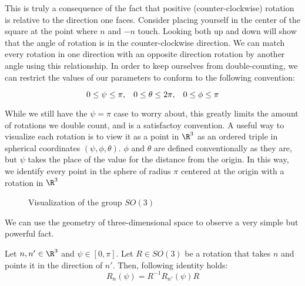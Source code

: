 This is truly a consequence of the fact that positive (counter-clockwise) rotation is relative to the direction one faces. Consider placing yourself in the center of the square at the point where $n$ and $-n$ touch. Looking both up and down will show that the angle of rotation is in the counter-clockwise direction. We can match every rotation in one direction with an opposite direction rotation by another angle using this relationship. In order to keep ourselves from double-counting, we can restrict the values of our parameters to conform to the following convention: 

$$0\leq\psi\leq\pi, \hspace{3mm} 0\leq\theta\leq2\pi, \hspace{3mm} 0\leq\phi\leq\pi$$

While we still have the $\psi=\pi$ case to worry about, this greatly limits the amount of rotations we double count, and is a satisfactoy convention. A useful way to visualize each rotation is to view it as a point in $\R^3$ as an ordered triple in spherical coordinates $(\psi,\phi,\theta)$. $\phi$ and $\theta$ are defined conventionally as they are, but $\psi$ takes the place of the value for the distance from the origin. In this way, we identify every point in the sphere of radius $\pi$ centered at the origin with a rotation in $\R^3$ \\

\begin{figure}[H]
	\centering
	\caption{Visualization of the group $SO(3)$}
	

\end{figure}

We can use the geometry of three-dimensional space to observe a very simple but powerful fact.

\begin{theorem}
	Let $n, n'\in\R^3$ and $\psi\in[0,\pi]$. Let $R\in SO(3)$ be a rotation that takes $n$ and points it in the direction of $n'$. Then, following identity holds:
$$R_{n}(\psi) = R^{-1}R_{n'}(\psi)R$$
\end{theorem}

